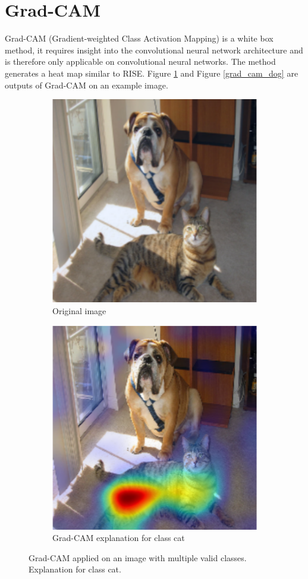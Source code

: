 \section{Grad-CAM}
Grad-CAM\cite{selvaraju2017grad} (Gradient-weighted Class Activation Mapping) is a white box method, it requires insight into the convolutional neural network architecture and is therefore only applicable on convolutional neural networks. The method generates a heat map similar to RISE. Figure \ref{grad_cam_cat} and Figure \ref{grad_cam_dog} are outputs of Grad-CAM on an example image.

\begin{figure}[H]
    \centering
    \begin{subfigure}{.5\textwidth}
        \centering
        \includegraphics[width=0.7\linewidth]{chapters/02_methods/images/grad-cam-original.png}
        \caption{Original image}
    \end{subfigure}\hfill%
    \begin{subfigure}{.5\textwidth}
        \centering
        \includegraphics[width=0.7\linewidth]{chapters/02_methods/images/grad-cam-cat.png}
        \caption{Grad-CAM explanation for class cat}
    \end{subfigure}
    \caption{Grad-CAM applied on an image with multiple valid classes. Explanation for class cat.}
    \label{grad_cam_cat}
\end{figure}

